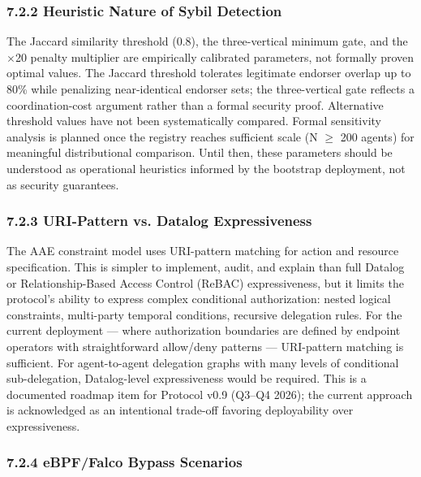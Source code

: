 \subsubsection{7.2.2 Heuristic Nature of Sybil Detection}

The Jaccard similarity threshold (0.8), the three-vertical minimum gate, and the $\times$20 penalty multiplier are empirically calibrated parameters, not formally proven optimal values. The Jaccard threshold tolerates legitimate endorser overlap up to 80\% while penalizing near-identical endorser sets; the three-vertical gate reflects a coordination-cost argument rather than a formal security proof. Alternative threshold values have not been systematically compared. Formal sensitivity analysis is planned once the registry reaches sufficient scale (N $\geq$ 200 agents) for meaningful distributional comparison. Until then, these parameters should be understood as operational heuristics informed by the bootstrap deployment, not as security guarantees.


\subsubsection{7.2.3 URI-Pattern vs. Datalog Expressiveness}

The AAE constraint model uses URI-pattern matching for action and resource specification. This is simpler to implement, audit, and explain than full Datalog or Relationship-Based Access Control (ReBAC) expressiveness, but it limits the protocol's ability to express complex conditional authorization: nested logical constraints, multi-party temporal conditions, recursive delegation rules. For the current deployment — where authorization boundaries are defined by endpoint operators with straightforward allow/deny patterns — URI-pattern matching is sufficient. For agent-to-agent delegation graphs with many levels of conditional sub-delegation, Datalog-level expressiveness would be required. This is a documented roadmap item for Protocol v0.9 (Q3–Q4 2026); the current approach is acknowledged as an intentional trade-off favoring deployability over expressiveness.


\subsubsection{7.2.4 eBPF/Falco Bypass Scenarios}

